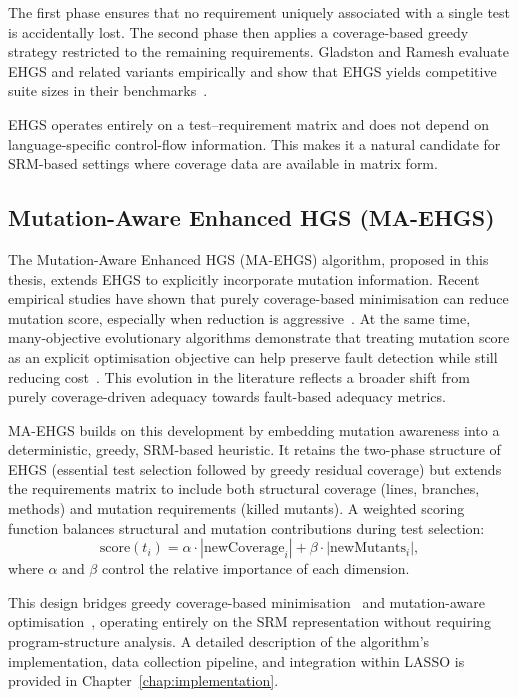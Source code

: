 The first phase ensures that no requirement uniquely associated with a single test
is accidentally lost. The second phase then applies a coverage-based greedy strategy
restricted to the remaining requirements. Gladston and Ramesh evaluate EHGS and
related variants empirically and show that EHGS yields competitive suite sizes in
their benchmarks~\cite{gladston2015}.

EHGS operates entirely on a test--requirement matrix and does not depend on
language-specific control-flow information. This makes it a natural candidate for
SRM-based settings where coverage data are available in matrix form.

\subsection{Mutation-Aware Enhanced HGS (MA-EHGS)}

The Mutation-Aware Enhanced HGS (MA-EHGS) algorithm, proposed in this thesis,
extends EHGS to explicitly incorporate mutation information. Recent empirical
studies have shown that purely coverage-based minimisation can reduce mutation
score, especially when reduction is aggressive~\cite{noemmer2020,jehan2023}.
At the same time, many-objective evolutionary algorithms demonstrate that treating
mutation score as an explicit optimisation objective can help preserve fault
detection while still reducing cost~\cite{wei2017}. This evolution in the
literature reflects a broader shift from purely coverage-driven adequacy towards
fault-based adequacy metrics.

MA-EHGS builds on this development by embedding mutation awareness into a
deterministic, greedy, SRM-based heuristic. It retains the two-phase structure
of EHGS (essential test selection followed by greedy residual coverage) but
extends the requirements matrix to include both structural coverage (lines,
branches, methods) and mutation requirements (killed mutants). A weighted scoring
function balances structural and mutation contributions during test selection:
\[
\mathrm{score}(t_i) = \alpha \cdot |\mathrm{newCoverage}_i|
                    + \beta \cdot |\mathrm{newMutants}_i|,
\]
where $\alpha$ and $\beta$ control the relative importance of each dimension.

This design bridges greedy coverage-based minimisation~\cite{yoo2012,noemmer2020}
and mutation-aware optimisation~\cite{jehan2023,wei2017}, operating entirely on
the SRM representation without requiring program-structure analysis. A detailed
description of the algorithm's implementation, data collection pipeline, and
integration within LASSO is provided in Chapter~\ref{chap:implementation}.

